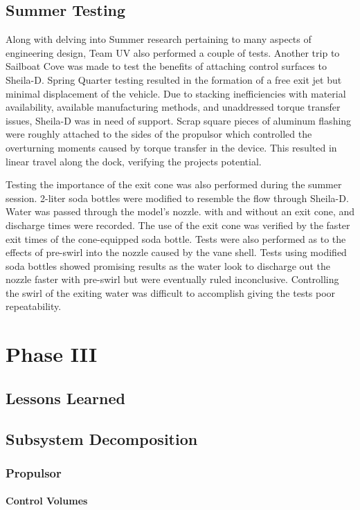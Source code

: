 \documentclass{report}
\begin{document}
\section{Summer Testing}
Along with delving into Summer research pertaining to many aspects of engineering design, Team UV also performed a couple of tests.  Another trip to Sailboat Cove was made to test the benefits of attaching control surfaces to Sheila-D.  Spring Quarter testing resulted in the formation of a free exit jet but minimal displacement of the vehicle.  Due to stacking inefficiencies with material availability, available manufacturing methods, and unaddressed torque transfer issues, Sheila-D was in need of support.  Scrap square pieces of aluminum flashing were roughly attached to the sides of the propulsor which controlled the overturning moments caused by torque transfer in the device.  This resulted in linear travel along the dock, verifying the projects potential.\par
Testing the importance of the exit cone was also performed during the summer session.  2-liter soda bottles were modified to resemble the flow through Sheila-D.  Water was passed through the model’s nozzle. with and without an exit cone, and discharge times were recorded.  The use of the exit cone was verified by the faster exit times of the cone-equipped soda bottle.  Tests were also performed as to the effects of pre-swirl into the nozzle caused by the vane shell.  Tests using modified soda bottles showed promising results as the water look to discharge out the nozzle faster with pre-swirl but were eventually ruled inconclusive.  Controlling the swirl of the exiting water was difficult to accomplish giving the tests poor repeatability.\\
\chapter{Phase III}
\section{Lessons Learned}
\section{Subsystem Decomposition}
\subsection{Propulsor}
\subsubsection{Control Volumes}
\end{document}
